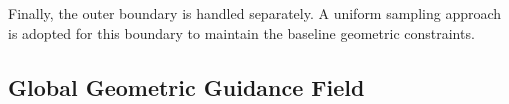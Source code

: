 \documentclass[%
 aip,
 amsmath,amssymb,
 reprint,%
nobibnotes,
]{revtex4-1}
\begin{document}
    Finally, the outer boundary is handled separately. A uniform sampling approach is adopted for this boundary to maintain the baseline geometric constraints.

\subsection{\label{sec:level1-4}Global Geometric Guidance Field}
\end{document}
